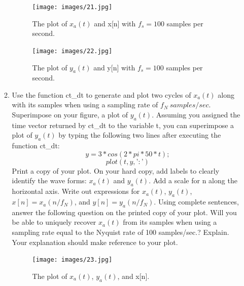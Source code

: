\documentclass[12pt]{article}
\begin{document}
\begin{enumerate}
\begin{enumerate}
\begin{figure}[H]
    \centering
    \begin{minipage}[b]{0.7\textwidth}
        \texttt{[image: images/21.jpg]}
    \end{minipage}
    \caption{The plot of $x_a(t)$ and x[n] with $f_s = 100$ samples per second.}
    \label{fig:21}
\end{figure}

\begin{figure}[H]
    \centering
    \begin{minipage}[b]{0.7\textwidth}
        \texttt{[image: images/22.jpg]}
    \end{minipage}
    \caption{The plot of $y_a(t)$ and y[n] with $f_s = 100$ samples per second.}
    \label{fig:22}
\end{figure}







\item Use the function ct\_dt to generate and plot two cycles of $x_a(t)$ along with its samples when using a sampling rate of $f_N\ samples/sec$. Superimpose on your figure, a plot of $y_a(t)$. Assuming you assigned the time vector returned by ct\_dt to the variable t, you can superimpose a plot of $y_a(t)$ by typing the following two lines after executing the function ct\_dt:
$$
y = 3*cos(2*pi*50*t);
$$
$$
plot(t,y,’:’)
$$
Print a copy of your plot. On your hard copy, add labels to clearly identify the wave forms: $x_a(t)$ and $y_a(t)$. Add a scale for n along the horizontal axis. Write out expressions for
$x_a(t)$, $y_a(t)$, $x[n] = x_a(n/f_N)$, and $y[n] = y_a(n/f_N)$. Using complete sentences, answer the following question on the printed copy of your plot. Will you be able to uniquely recover $x_a(t)$ from its samples when using a sampling rate equal to the Nyquist rate of 100 samples/sec.? Explain. Your explanation should make reference to your plot.



\begin{figure}[H]
    \centering
    \begin{minipage}[b]{0.7\textwidth}
        \texttt{[image: images/23.jpg]}
    \end{minipage}
    \caption{The plot of $x_a(t)$, $y_a(t)$, and x[n].}
    \label{fig:23}
\end{figure}

\end{enumerate}


\end{enumerate}
\end{document}
